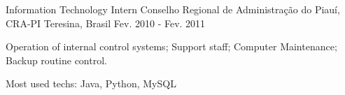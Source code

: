 \begin{cventries}

  \cventry
    {Information Technology Intern} %
    {Conselho Regional de Administração do Piauí, CRA-PI} %
    {Teresina, Brasil} %
    {Fev. 2010 - Fev. 2011} %
    {
      \begin{cvitems} %
        \item {Operation of internal control systems; Support staff; Computer Maintenance; Backup routine control.}
        \item {Most used techs: Java, Python, MySQL}
      \end{cvitems}
    }



\end{cventries}
